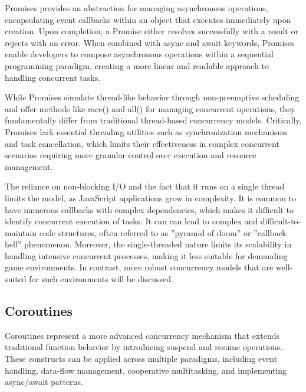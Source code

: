 \documentclass[]{project_interim}
\begin{document}
Promises provides an abstraction for managing asynchronous operations,
encapsulating event callbacks within an object that executes
immediately upon creation. \cite{zhao_concurrency_2021}
Upon completion, a Promise either
resolves successfully with a result or rejects with an error.
\cite{zhao_concurrency_2021} When combined with async and await
keywords, Promises enable
developers to compose asynchronous operations within a
sequential programming paradigm, creating a more linear and
readable approach to handling concurrent tasks.

While Promises simulate thread-like behavior through non-preemptive scheduling
and offer methods like race() and all() for managing concurrent operations,
\cite{noauthor_event_2024} they fundamentally differ from traditional thread-based
concurrency models.
Critically, Promises lack essential threading utilities such as synchronization
mechanisms and task cancellation,\cite{zhao_concurrency_2021} which limits their effectiveness in
complex concurrent scenarios requiring more granular control over execution
and resource management.

The reliance on non-blocking I/O and the fact that it runs on a single thread
limits the model, as JavaScript applications grow in complexity. It
is common to have numerous callbacks with complex dependencies,
which makes it difficult to identify concurrent
execution of tasks.
It can can lead to complex and difficult-to-maintain code structures, often
referred to as ”pyramid of doom” or ”callback hell” phenomenon.\cite{belson_survey_2019, noauthor_callback_nodate}
Moreover, the single-threaded nature limits its scalability in handling
intensive concurrent processes, making it less suitable for demanding game environments.
In contrast, more robust concurrency models that are well-suited for
such environments will be discussed.

\subsection{Coroutines}

Coroutines represent a more advanced concurrency mechanism that extends
traditional function behavior by introducing suspend and resume operations. \cite{belson_survey_2019}
These  constructs can be applied across multiple paradigms, including event
handling, data-flow management, cooperative multitasking, and
implementing async/await patterns.\cite{belson_survey_2019}
\end{document}
